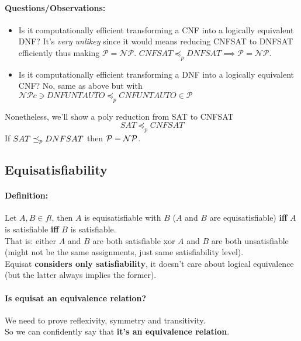 \documentclass[11pt]{article}
\begin{document}
	\paragraph{Questions/Observations: }
	\begin{itemize}
		\item Is it computationally efficient transforming a CNF into a logically equivalent DNF? It's \textit{very unlikey} since it would means reducing CNFSAT to DNFSAT efficiently thus making $\mathcal{P} = \mathcal{NP}$. $CNFSAT \preceq_p DNFSAT \implies \mathcal{P} = \mathcal{NP}$.\\
		
		\item Is it computationally efficient transforming a DNF into a logically equivalent CNF? No, same as above but with $\mathcal{NP}c \ni DNFUNTAUTO \preceq_p CNFUNTAUTO \in \mathcal{P}$
	\end{itemize}
	
	Nonetheless, we'll show a poly reduction from SAT to CNFSAT
	$$ SAT \preceq_p CNFSAT $$
	If $SAT \preceq_p DNFSAT$ then $\mathcal{P} = \mathcal{NP}$.\\
	
	\newpage
	
	\subsection{Equisatisfiability}
	
	\paragraph{Definition:} Let $A,B \in fl$, then $A$ is equisatisfiable with $B$ ($A$ and $B$ are equisatisfiable) \textbf{iff} $A$ is satisfiable \textbf{iff} $B$ is satisfiable.\\
	
	That is: either $A$ and $B$ are both satisfiable xor $A$ and $B$ are both unsatisfiable (might not be the same assignments, just same satisfiability level).\\
	
	
	
	
	Equisat \textbf{considers only satisfiability}, it doesn't care about logical equivalence (but the latter always implies the former).\\
	
	\paragraph{Is equisat an equivalence relation?} We need to prove reflexivity, symmetry and transitivity.\\
	So we can confidently say that \textbf{it's an equivalence relation}.\\
	
\end{document}
